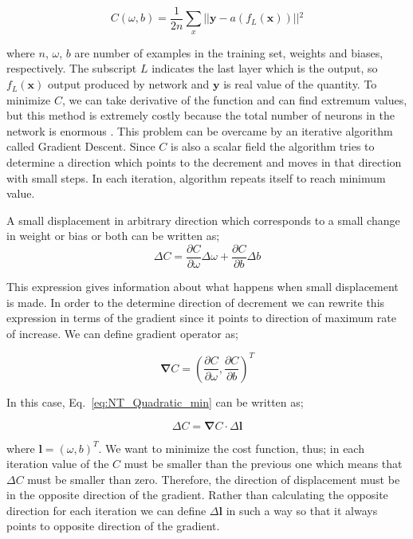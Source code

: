 \documentclass[a4paper,times,hidelinks,12pt]{article}
\begin{document}
\begin{equation}
\label{eq:NT_Quadratic}
C(\omega, b) = \frac{1}{2n} \sum\limits_{x} || \boldsymbol{y} - a(f_L(\boldsymbol{x})) ||{^2} 
\end{equation}

\noindent where $n$, $\omega$, $b$ are number of examples in the training set, weights and biases, respectively. The subscript $L$ indicates the last layer which is the output, so $f_L(\boldsymbol{x})$ output produced by network and $\boldsymbol{y}$ is real value of the quantity. To minimize $C$, we can take derivative of the function and can find extremum values, but this method is extremely costly because the total number of neurons in the network is enormous \cite{nielsen2015neural}. This problem can be overcame by an iterative algorithm called Gradient Descent. Since $C$ is also a scalar field the algorithm tries to determine a direction which points to the decrement and moves in that direction with small steps. In each iteration, algorithm repeats itself to reach minimum value. 

A small displacement in arbitrary direction which corresponds to a small change in weight or bias or both can be written as;
\begin{equation}
\label{eq:NT_Quadratic_min}
\Delta{C} = \frac{\partial{C}}{\partial{\omega}}\Delta{\omega} + \frac{\partial{C}}{\partial{b}}\Delta{b}
\end{equation}

\noindent This expression gives information about what happens when small displacement is made. In order to the determine direction of decrement we can rewrite this expression in terms of the gradient since it points to direction of maximum rate of increase. We can define gradient operator as;

\begin{equation}
\label{eq:gradient}
\boldsymbol{\nabla}{C} = \left(\frac{\partial{C}}{\partial{\omega}},\frac{\partial{C}}{\partial{b}} \right)^T
\end{equation}

\noindent In this case, Eq.~\eqref{eq:NT_Quadratic_min} can be written as;

\begin{equation}
\label{eq:NT_Quadratic_min_gradient_form}
\Delta{C} = \boldsymbol{\nabla}{C} \cdot \Delta \boldsymbol{l}
\end{equation}

\noindent where $\boldsymbol{l} = (\omega, b)^T$. We want to minimize the cost function, thus; in each iteration value of the $C$ must be smaller than the previous one which means that $\Delta{C}$ must be smaller than zero. Therefore, the direction of displacement must be in the opposite direction of the gradient. Rather than calculating the opposite direction for each iteration we can define $\Delta{\boldsymbol{l}}$ in such a way so that it always points to opposite direction of the gradient.
\end{document}
